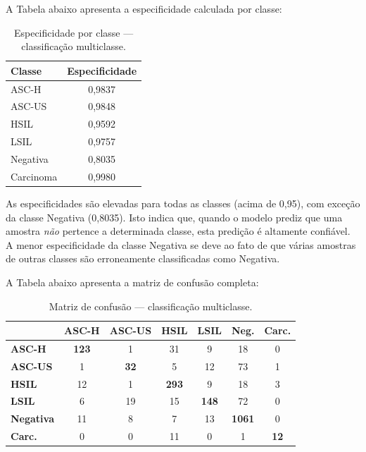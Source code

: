 \documentclass[12pt, a4paper]{article}
\begin{document}
A Tabela abaixo apresenta a especificidade calculada por classe:

\begin{table}[H]
\centering
\caption{Especificidade por classe --- classificação multiclasse.}
\label{tab:especificidade}
\begin{tabular}{lc}
\toprule
\textbf{Classe} & \textbf{Especificidade} \\
\midrule
ASC-H     & 0,9837 \\
ASC-US    & 0,9848 \\
HSIL      & 0,9592 \\
LSIL      & 0,9757 \\
Negativa  & 0,8035 \\
Carcinoma & 0,9980 \\
\bottomrule
\end{tabular}
\end{table}

As especificidades são elevadas para todas as classes (acima de 0,95), com exceção da classe Negativa (0,8035). Isto indica que, quando o modelo prediz que uma amostra \textit{não} pertence a determinada classe, esta predição é altamente confiável. A menor especificidade da classe Negativa se deve ao fato de que várias amostras de outras classes são erroneamente classificadas como Negativa.

A Tabela abaixo apresenta a matriz de confusão completa:

\begin{table}[H]
\centering
\caption{Matriz de confusão --- classificação multiclasse.}
\label{tab:cm_multi}
\begin{tabular}{lcccccc}
\toprule
 & \textbf{ASC-H} & \textbf{ASC-US} & \textbf{HSIL} & \textbf{LSIL} & \textbf{Neg.} & \textbf{Carc.} \\
\midrule
\textbf{ASC-H}  & \textbf{123} & 1   & 31  & 9   & 18  & 0 \\
\textbf{ASC-US}  & 1   & \textbf{32}  & 5   & 12  & 73  & 1 \\
\textbf{HSIL}    & 12  & 1   & \textbf{293} & 9   & 18  & 3 \\
\textbf{LSIL}    & 6   & 19  & 15  & \textbf{148} & 72  & 0 \\
\textbf{Negativa}& 11  & 8   & 7   & 13  & \textbf{1061}& 0 \\
\textbf{Carc.}   & 0   & 0   & 11  & 0   & 1   & \textbf{12} \\
\bottomrule
\end{tabular}
\end{table}
\end{document}
